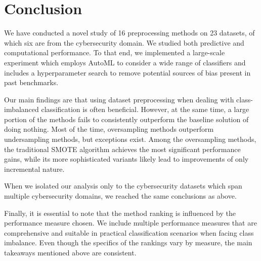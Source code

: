 \documentclass[conference]{IEEEtran}
\begin{document}
\section{Conclusion}
\label{section:conclusion}

We have conducted a novel study of 16 preprocessing methods on 23 datasets, of which six are from
the cybersecurity domain. We studied both predictive and computational performance. To that end, we
implemented a large-scale experiment which employs AutoML to consider a wide range of classifiers
and includes a hyperparameter search to remove potential sources of bias present in past
benchmarks.

Our main findings are that using dataset preprocessing when dealing with class-imbalanced
classification is often beneficial. However, at the same time, a large portion of the methods fails
to consistently outperform the baseline solution of doing nothing. Most of the time, oversampling
methods outperform undersampling methods, but exceptions exist. Among the oversampling methods, the
traditional SMOTE algorithm achieves the most significant performance gains, while its more
sophisticated variants likely lead to improvements of only incremental nature.

When we isolated our analysis only to the cybersecurity datasets which span multiple cybersecurity
domains, we reached the same conclusions as above.

Finally, it is essential to note that the method ranking is influenced by the performance measure
chosen. We include multiple performance measures that are comprehensive and suitable in practical
classification scenarios when facing class imbalance. Even though the specifics of the rankings
vary by measure, the main takeaways mentioned above are consistent.





\clearpage
\onecolumn
\appendices
\end{document}
